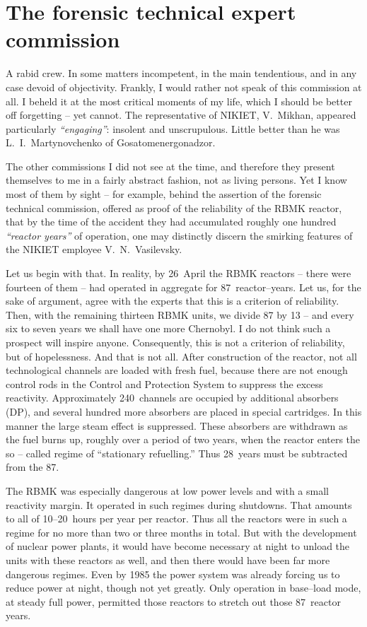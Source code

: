 \documentclass[openright]{bookest}
\begin{document}
\section{The forensic technical expert commission}

A rabid crew. In some matters incompetent, in the main tendentious, and in any case devoid of objectivity. Frankly, I would rather not speak of this commission at all. I beheld it at the most critical moments of my life, which I should be better off forgetting -- yet cannot. The representative of NIKIET, V.~Mikhan, appeared particularly \textit{``engaging''}: insolent and unscrupulous. Little better than he was L.~I.~Martynovchenko of Gosatomenergonadzor.

The other commissions I did not see at the time, and therefore they present themselves to me in a fairly abstract fashion, not as living persons. Yet I know most of them by sight -- for example, behind the assertion of the forensic technical commission, offered as proof of the reliability of the RBMK reactor, that by the time of the accident they had accumulated roughly one hundred \textit{``reactor years''} of operation, one may distinctly discern the smirking features of the NIKIET employee V.~N.~Vasilevsky.


Let us begin with that. In reality, by 26~April the RBMK reactors -- there were fourteen of them -- had operated in aggregate for \num{87}~reactor--years. Let us, for the sake of argument, agree with the experts that this is a criterion of reliability. Then, with the remaining thirteen RBMK units, we divide \num{87} by \num{13} -- and every six to seven years we shall have one more Chernobyl. I do not think such a prospect will inspire anyone. Consequently, this is not a criterion of reliability, but of hopelessness. And that is not all. After construction of the reactor, not all technological channels are loaded with fresh fuel, because there are not enough control rods in the Control and Protection System to suppress the excess reactivity. Approximately \num{240}~channels are occupied by additional absorbers (DP), and several hundred more absorbers are placed in special cartridges. In this manner the large steam effect is suppressed. These absorbers are withdrawn as the fuel burns up, roughly over a period of two years, when the reactor enters the so -- called regime of ``stationary refuelling.'' Thus \num{28}~years must be subtracted from the \num{87}.

The RBMK was especially dangerous at low power levels and with a small reactivity margin. It operated in such regimes during shutdowns. That amounts to all of \numrange{10}{20}~hours per year per reactor. Thus all the reactors were in such a regime for no more than two or three months in total. But with the development of nuclear power plants, it would have become necessary at night to unload the units with these reactors as well, and then there would have been far more dangerous regimes. Even by 1985 the power system was already forcing us to reduce power at night, though not yet greatly. Only operation in base--load mode, at steady full power, permitted those reactors to stretch out those \num{87}~reactor years.
\end{document}

